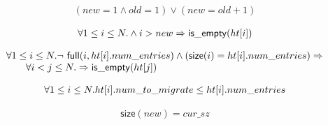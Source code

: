 \begin{lemma}
  \begin{equation*}
    \begin{array}{l}      
      (new = 1 \wedge old = 1) \vee (new = old+1)
    \end{array}
  \end{equation*}
  \label{old_and_new}
\end{lemma}

\begin{lemma}
  \begin{equation*}
\begin{array}{l}      
  \forall 1 \leq i \leq N.  \wedge i > new \Rightarrow \mathsf{is\_empty}(\mbox{$ht[i]$})
\end{array}
\end{equation*}  
\label{empty_beyond_new}  
\end{lemma}  

\begin{lemma}
  \begin{equation*}
\begin{array}{l}        
  \forall 1 \leq i \leq N.  \mbox{$\neg\ \mathsf{full}(i,
    \mbox{$ht[i]$}.num\_entries)$} \wedge (\mathsf{size}(i) =
  \mbox{$ht[i]$}.num\_entries) \Rightarrow \\
  \quad \quad  \forall i < j \leq N.  \Rightarrow \mathsf{is\_empty}(\mbox{$ht[j]$})
\end{array}
\end{equation*} 
\label{empty_beyond_non_full}
\end{lemma}

\begin{lemma}
  \begin{equation*}
\begin{array}{l}        
  \forall 1 \leq i \leq N. \mbox{$ht[i]$}.num\_to\_migrate \leq \mbox{$ht[i]$}.num\_entries
\end{array}
\end{equation*}  
\label{num_to_migrate_and_num_entries}
\end{lemma}  

\begin{lemma}
  \begin{equation*}
\begin{array}{l}        
  \mathsf{size}(new) = cur\_sz
\end{array}
\end{equation*}  
\label{table_sizes}
\end{lemma}  

